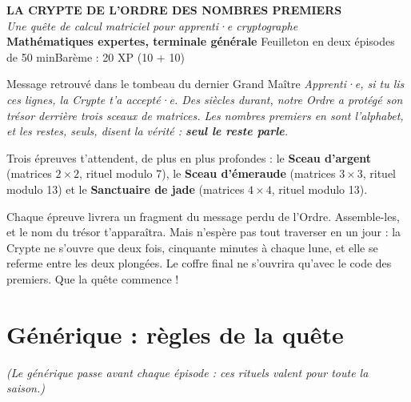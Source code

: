 \documentclass[11pt,a4paper]{article}
\begin{document}
\begin{center}
  {\LARGE\bfseries\textcolor{nuit}{LA CRYPTE DE L'ORDRE DES NOMBRES PREMIERS}}\\[2mm]
  {\large\itshape Une quête de calcul matriciel pour apprenti·e cryptographe}\\[2mm]
  \textbf{Mathématiques expertes, terminale générale}\quad\textbullet\quad
  Feuilleton en deux épisodes de 50 min\quad\textbullet\quad Barème : 20 XP (10 + 10)
\end{center}

\vspace{1mm}
\begin{missive}{Message retrouvé dans le tombeau du dernier Grand Maître}
\itshape
Apprenti·e, si tu lis ces lignes, la Crypte t'a accepté·e.
Des siècles durant, notre Ordre a protégé son trésor derrière trois sceaux
de matrices. Les nombres premiers en sont l'alphabet, et les restes,
seuls, disent la vérité : \textbf{seul le reste parle}.

Trois épreuves t'attendent, de plus en plus profondes :
le \textcolor{argent}{\textbf{Sceau d'argent}} (matrices $2\times 2$, rituel modulo 7),
le \textcolor{emeraude}{\textbf{Sceau d'émeraude}} (matrices $3\times 3$, rituel modulo 13)
et le \textcolor{jade}{\textbf{Sanctuaire de jade}} (matrices $4\times 4$, rituel modulo 13).

Chaque épreuve livrera un fragment du message perdu de l'Ordre.
Assemble-les, et le nom du trésor t'apparaîtra. Mais n'espère pas tout
traverser en un jour : la Crypte ne s'ouvre que deux fois, cinquante
minutes à chaque lune, et elle se referme entre les deux plongées.
Le coffre final ne s'ouvrira qu'avec le code des premiers.
Que la quête commence !
\end{missive}

\section*{\textcolor{nuit}{Générique : règles de la quête}}

{\small\itshape (Le générique passe avant chaque épisode : ces rituels
valent pour toute la saison.)}
\end{document}
